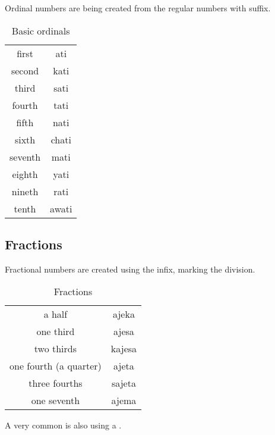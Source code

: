 Ordinal numbers are being created from the regular numbers with  suffix.

\begin{table}[ht]
  \centering
  \caption{Basic ordinals}
  \begin{tabular}{cc} \toprule
    first   & ati   \\
    second  & kati  \\
    third   & sati  \\
    fourth  & tati  \\
    fifth   & nati  \\
    sixth   & chati \\
    seventh & mati  \\
    eighth  & yati  \\
    nineth  & rati  \\
    tenth   & awati \\\bottomrule
  \end{tabular}
  \label{tab:numerals3}
\end{table}

\subsection{Fractions}

Fractional numbers are created using the  infix, marking the division.


\begin{table}[ht]
  \centering
  \caption{Fractions}
  \begin{tabular}{cc} \toprule
    a half                 & ajeka  \\
    one third              & ajesa  \\
    two thirds             & kajesa \\
    one fourth (a quarter) & ajeta  \\
    three fourths          & sajeta \\
    one seventh            & ajema  \\\bottomrule
  \end{tabular}
  \label{tab:numerals4}
\end{table}

A very common is also using a .

